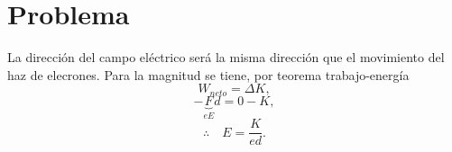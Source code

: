 \section*{Problema}

La dirección del campo eléctrico será la misma dirección que el movimiento del haz de elecrones. Para la magnitud se tiene, por teorema trabajo-energía
	$$ W_{neto} = \Delta K, $$
	$$ -\underbrace{F}_{eE} d = 0 - K, $$
	$$ \therefore \quad E = \frac{K}{ed}. $$










